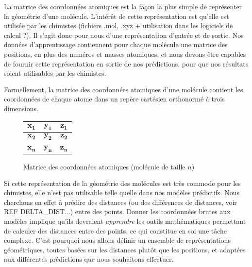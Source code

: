 \par La matrice des coordonnées atomiques est la façon la plus simple de représenter la géométrie d'une molécule. L'intérêt de cette représentation est qu'elle est utilisée par les chimistes (fichiers .mol, .xyz + utilisation dans les logiciels de calcul ?). Il s'agit donc pour nous d'une représentation d'entrée et de sortie. Nos données d'apprentissage contiennent pour chaque molécule une matrice des positions, en plus des numéros et masses atomiques, et nous devons être capables de fournir cette représentation en sortie de nos prédictions, pour que nos résultats soient utilisables par les chimistes.\\

\par Formellement, la matrice des coordonnées atomiques d'une molécule contient les coordonnées de chaque atome dans un repère cartésien orthonormé à trois dimensions.

\begin{figure}[!h]
	\centering
	
	\begin{tabular}{|c|c|c|}
		\hline
		$\boldsymbol{x_1}$ & $\boldsymbol{y_1}$ & $\boldsymbol{z_1}$ \\ \hline	
		$\boldsymbol{x_2}$ & $\boldsymbol{y_2}$ & $\boldsymbol{z_2}$ \\ \hline	
		\textbf{\rot{... }} & \textbf{\rot{... }} & \textbf{\rot{... }}\\ \hline 	
		$\boldsymbol{x_n}$ & $\boldsymbol{y_n}$ & $\boldsymbol{z_n}$ \\ \hline	
	\end{tabular}

	\caption{Matrice des coordonnées atomiques (molécule de taille $n$)}
\end{figure}

\par Si cette représentation de la géométrie des molécules est très commode pour les chimistes, elle n'est pas utilisable telle quelle dans nos modèles prédictifs. Nous cherchons en effet à prédire des distances (ou des différences de distances, voir REF DELTA\_DIST...) entre des points. Donner les coordonnées brutes aux modèles implique qu'ils devraient \emph{apprendre} les outils mathématiques permettant de calculer des distances entre des points, ce qui constitue en soi une tâche complexe. C'est pourquoi nous allons définir un ensemble de représentations géométriques, toutes basées sur les distances plutôt que les positions, et adaptées aux différentes prédictions que nous souhaitons effectuer.